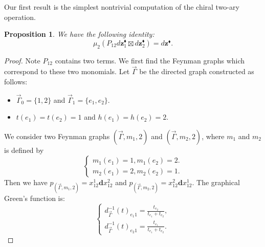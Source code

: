\documentclass[11pt]{amsart}
\newtheorem{prop}[thm]{Proposition}
\theoremstyle{definition}
\theoremstyle{remark}
\numberwithin{equation}{section}
\begin{document}
Our first result is the simplest nontrivial computation of the chiral two-ary operation.
    \begin{prop}
        We have the following identity:
        $$
        \mu_{2}(P_{12}
        d \mathbf{z}_{1}^{\blacklozenge} \boxtimes d \mathbf{z}^{\blacklozenge}_{2}) 
        = d \mathbf{z}
        ^{\blacklozenge} .
        $$
    \end{prop}
    \begin{proof}
    Note $P_{12}$ contains two terms. We first find the Feynman graphs which correspond to these two monomials. Let
    $\vec{\Gamma}$ be the directed graph constructed as follows:
        \begin{itemize}
            \item $\vec{\Gamma}_{0}=\{1,2\}$ and $\vec{\Gamma}_{1}=\{e_{1},e_{2}\}$.
            \item $t(e_{1})=t(e_{2})=1$ and $h(e_{1})=h(e_{2})=2$.
        \end{itemize}
        We consider two Feynman graphs $(\vec{\Gamma},m_{1},2)$ and $(\vec{\Gamma},m_{2},2)$, where $m_{1}$ and $m_{2}$ is defined by
        $$
        \begin{cases}
            m_{1}(e_{1})=1, m_{1}(e_{2})=2.\\
            m_{2}(e_{1})=2, m_{2}(e_{2})=1.
        \end{cases}
        $$
        Then we have $p_{(\vec{\Gamma},m_{1},2)}=x_{12}^1\mathbf{d}x_{12}^{2}$ and $p_{(\vec{\Gamma},m_{2},2)}=x_{12}^{2}
        \mathbf{d}x_{12}^{1}$. The graphical Green's function is:
        $$
        \begin{cases}
            d^{-1}_{\vec{\Gamma}}(t)_{e_{1}1}=\frac{t_{e_{2}}}{t_{e_{1}}+t_{e_{2}}},\\
            d^{-1}_{\vec{\Gamma}}(t)_{e_{2}1}=\frac{t_{e_{1}}}{t_{e_{1}}+t_{e_{2}}}.
        \end{cases}
        $$
        

\end{proof}
\end{document}
